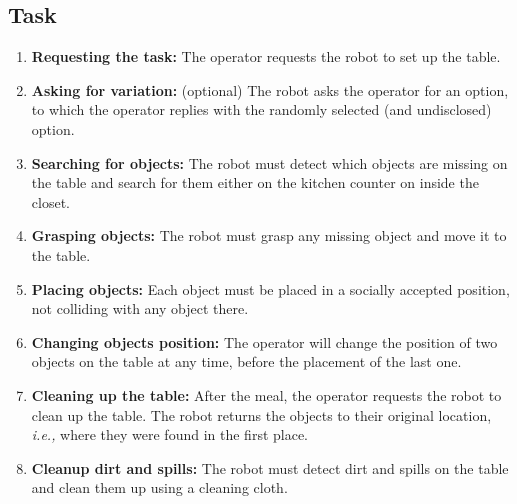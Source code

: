 \subsection{Task}
\label{sattu:task}

\begin{enumerate}
\item \textbf{Requesting the task:} The operator requests the robot to set up the table.
\item\label{sattu:s2} \textbf{Asking for variation:} (optional) The robot asks the operator for an option, to which the operator replies with the randomly selected (and undisclosed) option.
\item \textbf{Searching for objects:} The robot must detect which objects are missing on the table and search for them either on the kitchen counter on inside the closet.
\item \textbf{Grasping objects:} The robot must grasp any missing object and move it to the table.
\item \textbf{Placing objects:} Each object must be placed in a socially accepted position, not colliding with any object there.
\item \textbf{Changing objects position:} The operator will change the position of two objects on the table at any time, before the placement of the last one.
\item \textbf{Cleaning up the table:} After the meal, the operator requests the robot to clean up the table. The robot returns the objects to their original location, \textit{i.e.,} where they were found in the first place.
\item \textbf{Cleanup dirt and spills:} The robot must detect dirt and spills on the table and clean them up using a cleaning cloth.
\end{enumerate}


